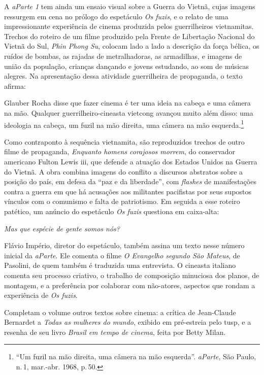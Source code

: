 A {\it aParte 1} tem ainda um ensaio visual sobre a Guerra do Vietnã,
cujas imagens ressurgem em cena no prólogo do espetáculo {\it Os fuzis},
e o relato de uma impressionante experiência de cinema produzida pelos
guerrilheiros vietnamitas. Trechos do roteiro de um filme produzido pela
Frente de Libertação Nacional do Vietnã do Sul, {\it Phin Phong Su},
colocam lado a lado a descrição da força bélica, os ruídos de bombas, as
rajadas de metralhadoras, as armadilhas, e imagens de união da
população, crianças dançando e jovens estudando, ao som de músicas
alegres. Na apresentação dessa atividade guerrilheira de propaganda, o
texto afirma:

\startblockquote
Glauber Rocha disse que fazer cinema é ter uma ideia na cabeça e uma
câmera na mão. Qualquer guerrilheiro-cineasta vietcong avançou muito
além disso: uma ideologia na cabeça, um fuzil na mão direita, uma câmera
na mão esquerda.\footnote{“Um fuzil na mão direita, uma câmera na mão
  esquerda”. {\it aParte}, São Paulo, n.\,1, mar.-abr. 1968, p.\,50.}
\stopblockquote

Como contraponto à sequência vietnamita, são reproduzidos trechos de
outro filme de propaganda, {\it Enquanto homens corajosos morrem}, do
conservador americano Fulton Lewis {\sc iii}, que defende a atuação dos
Estados Unidos na Guerra do Vietnã. A obra combina imagens do conflito a
discursos abstratos sobre a posição do país, em defesa da “paz e da
liberdade”, com {\it flashes} de manifestações contra a guerra em que há
acusações aos militantes pacifistas por seus supostos vínculos com o
comunismo e falta de patriotismo. Em seguida a esse roteiro patético, um
anúncio do espetáculo {\it Os fuzis} questiona em caixa-alta:

{\it Mas que espécie de gente somos nós?}

Flávio Império, diretor do espetáculo, também assina um texto nesse
número inicial da {\it aParte}. Ele comenta o filme {\it O Evangelho
segundo São Mateus}, de Pasolini, de quem também é traduzida uma
entrevista. O cineasta italiano comenta seu processo criativo, o
trabalho de composição minuciosa dos planos, de montagem, e a
preferência por colaborar com não-atores, aspectos que rondam a
experiência de {\it Os fuzis}.

Completam o volume outros textos sobre cinema: a crítica de Jean-Claude
Bernardet a {\it Todas as mulheres do mundo}, exibido em pré-estreia
pelo {\sc tusp}, e a resenha de seu livro {\it Brasil em tempo de cinema},
feita por Betty Milan.

